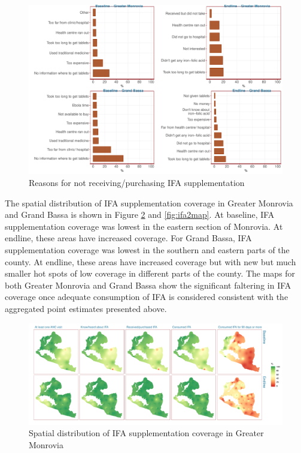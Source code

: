 \documentclass[12pt,a4paper]{article}
\begin{document}
\begin{figure}[H]

{\centering \includegraphics{liberiaCoverageFinalReport_files/figure-latex/ifa2plot-1} 

}

\caption{Reasons for not receiving/purchasing IFA supplementation}\label{fig:ifa2plot}
\end{figure}

The spatial distribution of IFA supplementation coverage in Greater Monrovia and Grand Bassa is shown in Figure \ref{fig:ifa1map} and \ref{fig:ifa2map}. At baseline, IFA supplementation coverage was lowest in the eastern section of Monrovia. At endline, these areas have increased coverage. For Grand Bassa, IFA supplementation coverage was lowest in the southern and eastern parts of the county. At endline, these areas have increased coverage but with new but much smaller hot spots of low coverage in different parts of the county. The maps for both Greater Monrovia and Grand Bassa show the significant faltering in IFA coverage once adequate consumption of IFA is considered consistent with the aggregated point estimates presented above.

\begin{figure}[H]

{\centering \includegraphics{liberiaCoverageFinalReport_files/figure-latex/ifa1map-1} 

}

\caption{Spatial distribution of IFA supplementation coverage in Greater Monrovia}\label{fig:ifa1map}
\end{figure}
\end{document}
